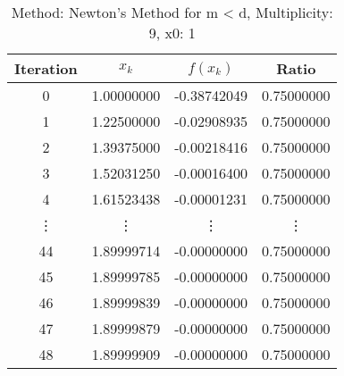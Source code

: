 \begin{table}
\centering
\caption{Method: Newton's Method for m < d, Multiplicity: 9, x0: 1}
\label{tab:table_Newton's_Method_for_m_<_d_9_1}
\begin{tabular}{c c c c}
\toprule
Iteration &      $x_k$ &    $f(x_k)$ &      Ratio \\
\midrule
        0 & 1.00000000 & -0.38742049 & 0.75000000 \\
        1 & 1.22500000 & -0.02908935 & 0.75000000 \\
        2 & 1.39375000 & -0.00218416 & 0.75000000 \\
        3 & 1.52031250 & -0.00016400 & 0.75000000 \\
        4 & 1.61523438 & -0.00001231 & 0.75000000 \\
   \vdots &     \vdots &      \vdots &     \vdots \\
       44 & 1.89999714 & -0.00000000 & 0.75000000 \\
       45 & 1.89999785 & -0.00000000 & 0.75000000 \\
       46 & 1.89999839 & -0.00000000 & 0.75000000 \\
       47 & 1.89999879 & -0.00000000 & 0.75000000 \\
       48 & 1.89999909 & -0.00000000 & 0.75000000 \\
\bottomrule
\end{tabular}
\end{table}
